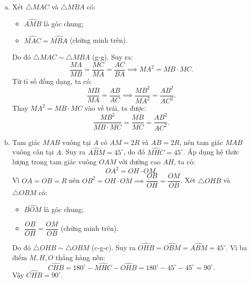 \begin{bt}
{\begin{enumerate}[a)]
	Mặt khác, trong tam giác vuông $MAB$ tại $A$:
	$$\widehat{MAC} + \widehat{AMC} = 90^\circ \text{ và } \widehat{ABM} + \widehat{AMC} = 90^\circ \implies \widehat{MAC} = \widehat{ABM}.$$
	Suy ra $\widehat{MHC} = \widehat{ABM}$.
	\item Xét $\triangle MAC$ và $\triangle MBA$ có:
	\begin{itemize}
		\item $\widehat{AMB}$ là góc chung;
		\item $\widehat{MAC} = \widehat{MBA}$ (chứng minh trên).
	\end{itemize}
	Do đó $\triangle MAC \sim \triangle MBA$ (g-g).
	Suy ra:
	$$\dfrac{MA}{MB} = \dfrac{MC}{MA} = \dfrac{AC}{BA} \implies MA^2 = MB \cdot MC.$$
	Từ tỉ số đồng dạng, ta có:
	$$\dfrac{MB}{MA} = \dfrac{AB}{AC} \implies \dfrac{MB^2}{MA^2} = \dfrac{AB^2}{AC^2}.$$
	Thay $MA^2 = MB \cdot MC$ vào vế trái, ta được:
	$$\dfrac{MB^2}{MB \cdot MC} = \dfrac{MB}{MC} = \dfrac{AB^2}{AC^2}.$$
	\item Tam giác $MAB$ vuông tại $A$ có $AM = 2R$ và $AB = 2R$, nên tam giác $MAB$ vuông cân tại $A$.
	Suy ra $\widehat{ABM} = 45^\circ$, do đó $\widehat{MHC} = 45^\circ$.
	Áp dụng hệ thức lượng trong tam giác vuông $OAM$ với đường cao $AH$, ta có:
	$$OA^2 = OH \cdot OM.$$
	Vì $OA = OB = R$ nên $OB^2 = OH \cdot OM \implies \dfrac{OB}{OH} = \dfrac{OM}{OB}$.
	Xét $\triangle OHB$ và $\triangle OBM$ có:
	\begin{itemize}
		\item $\widehat{BOM}$ là góc chung;
		\item $\dfrac{OB}{OH} = \dfrac{OM}{OB}$ (chứng minh trên).
	\end{itemize}
	Do đó $\triangle OHB \sim \triangle OBM$ (c-g-c).
	Suy ra $\widehat{OHB} = \widehat{OBM} = \widehat{ABM} = 45^\circ$.
	Vì ba điểm $M, H, O$ thẳng hàng nên:
	$$\widehat{CHB} = 180^\circ - \widehat{MHC} - \widehat{OHB} = 180^\circ - 45^\circ - 45^\circ = 90^\circ.$$
	Vậy $\widehat{CHB} = 90^\circ$.
\end{enumerate}
}
\end{bt}


